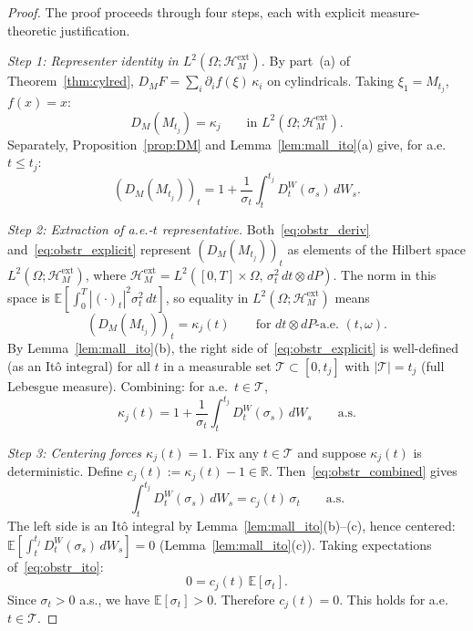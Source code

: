 \documentclass[11pt,a4paper]{article}
\theoremstyle{plain}
\theoremstyle{definition}
\theoremstyle{remark}
\newcommand{\E}{\mathbb{E}}
\newcommand{\R}{\mathbb{R}}
\newcommand{\HM}{\mathcal{H}_M}
\begin{document}
\begin{proof}
The proof proceeds through four steps, each with explicit measure-theoretic justification.

\emph{Step 1: Representer identity in $L^2(\Omega;\HM^{\mathrm{ext}})$.} By part~(a) of Theorem~\ref{thm:cylred}, $D_M F = \sum_i \partial_i f(\xi)\,\kappa_i$ on cylindricals. Taking $\xi_1 = M_{t_j}$, $f(x) = x$:
\begin{equation}\label{eq:obstr_deriv}
D_M(M_{t_j}) = \kappa_j \qquad \text{in } L^2(\Omega;\HM^{\mathrm{ext}}).
\end{equation}
Separately, Proposition~\ref{prop:DM} and Lemma~\ref{lem:mall_ito}(a) give, for a.e.\ $t \le t_j$:
\begin{equation}\label{eq:obstr_explicit}
(D_M(M_{t_j}))_t = 1 + \frac{1}{\sigma_t}\int_t^{t_j} D_t^W(\sigma_s)\,dW_s.
\end{equation}

\emph{Step 2: Extraction of a.e.-$t$ representative.} Both~\eqref{eq:obstr_deriv} and~\eqref{eq:obstr_explicit} represent $(D_M(M_{t_j}))_t$ as elements of the Hilbert space $L^2(\Omega;\HM^{\mathrm{ext}})$, where $\HM^{\mathrm{ext}} = L^2([0,T]\times\Omega,\,\sigma_t^2\,dt\otimes dP)$. The norm in this space is $\E[\int_0^T|(\cdot)_t|^2\sigma_t^2\,dt]$, so equality in $L^2(\Omega;\HM^{\mathrm{ext}})$ means
\[
(D_M(M_{t_j}))_t = \kappa_j(t) \qquad \text{for } dt\otimes dP\text{-a.e.\ } (t,\omega).
\]
By Lemma~\ref{lem:mall_ito}(b), the right side of~\eqref{eq:obstr_explicit} is well-defined (as an It\^o integral) for all $t$ in a measurable set $\mathcal{T} \subset [0,t_j]$ with $|\mathcal{T}| = t_j$ (full Lebesgue measure). Combining: for a.e.\ $t \in \mathcal{T}$,
\begin{equation}\label{eq:obstr_combined}
\kappa_j(t) = 1 + \frac{1}{\sigma_t}\int_t^{t_j} D_t^W(\sigma_s)\,dW_s \qquad \text{a.s.}
\end{equation}

\emph{Step 3: Centering forces $\kappa_j(t) = 1$.} Fix any $t \in \mathcal{T}$ and suppose $\kappa_j(t)$ is deterministic. Define $c_j(t) := \kappa_j(t) - 1 \in \R$. Then~\eqref{eq:obstr_combined} gives
\begin{equation}\label{eq:obstr_ito}
\int_t^{t_j} D_t^W(\sigma_s)\,dW_s = c_j(t)\,\sigma_t \qquad \text{a.s.}
\end{equation}
The left side is an It\^o integral by Lemma~\ref{lem:mall_ito}(b)--(c), hence centered: $\E[\int_t^{t_j} D_t^W(\sigma_s)\,dW_s] = 0$ (Lemma~\ref{lem:mall_ito}(c)). Taking expectations of~\eqref{eq:obstr_ito}:
\[
0 = c_j(t)\,\E[\sigma_t].
\]
Since $\sigma_t > 0$ a.s., we have $\E[\sigma_t] > 0$. Therefore $c_j(t) = 0$. This holds for a.e.\ $t \in \mathcal{T}$.


\end{proof}
\end{document}
